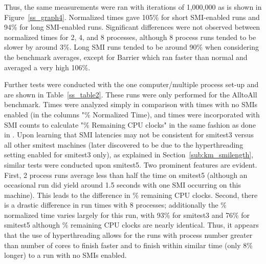 \documentclass{IEEEtran}
\begin{document}
Thus, the same measurements were ran with iterations of 1,000,000 as is shown in Figure~\ref{ss_graph4}. Normalized times gave 105\% for short SMI-enabled runs and 94\% for long SMI-enabled runs. Significant differences were not observed between normalized times for 2, 4, and 8 processes, although 8 process runs tended to be slower by around 3\%. Long SMI runs tended to be around 90\% when considering the benchmark averages, except for Barrier which ran faster than normal and averaged a very high 106\%.  

Further tests were conducted with the one computer/multiple process set-up and are shown in Table~\ref{ss_table2}. These runs were only performed for the AlltoAll benchmark. Times were analyzed simply in comparison with times with no SMIs enabled (in the columns "\% Normalized Time), and times were incorporated with SMI counts to calculate "\% Remaining CPU clocks" in the same fashion as done in \cite{KD}. Upon learning that SMI latencies may not be consistent for smitest3 versus all other smitest machines (later discovered to be due to the hyperthreading setting enabled for smitest3 only), as explained in Section~\ref{sub:km_smilength}, similar tests were conducted upon smitest5. Two prominent features are evident. First, 2 process runs average less than half the time on smitest5 (although an occasional run did yield around 1.5 seconds with one SMI occurring on this machine). This leads to the difference in \% remaining CPU clocks. Second, there is a drastic difference in run times with 8 processes; additionally the \% normalized time varies largely for this run, with 93\% for smitest3 and 76\% for smitest5 although \% remaining CPU clocks are nearly identical. Thus, it appears that the use of hyperthreading allows for the runs with process number greater than number of cores to finish faster and to finish within similar time (only 8\% longer) to a run with no SMIs enabled. 
\end{document}
